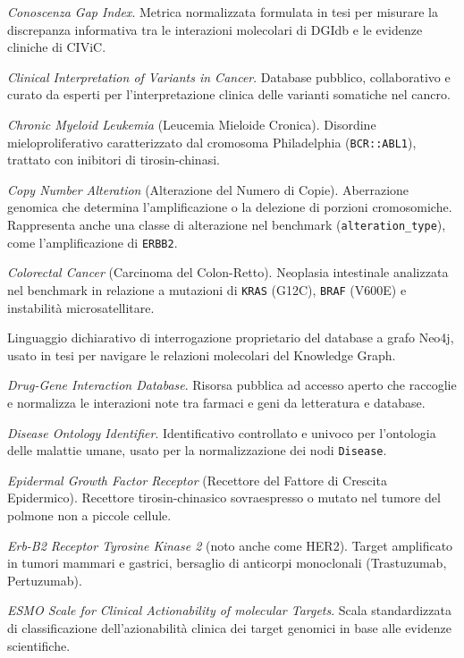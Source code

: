 \documentclass[11pt,a4paper]{article}
\newcommand{\code}[1]{\texttt{\small #1}}
\begin{document}
\begin{description}[leftmargin=1.4em,style=nextline]
\item[CGI] \emph{Conoscenza Gap Index}. Metrica normalizzata formulata in tesi per misurare la discrepanza informativa tra le interazioni molecolari di DGIdb e le evidenze cliniche di CIViC.
\item[CIViC] \emph{Clinical Interpretation of Variants in Cancer}. Database pubblico, collaborativo e curato da esperti per l'interpretazione clinica delle varianti somatiche nel cancro.
\item[CML] \emph{Chronic Myeloid Leukemia} (Leucemia Mieloide Cronica). Disordine mieloproliferativo caratterizzato dal cromosoma Philadelphia (\code{BCR::ABL1}), trattato con inibitori di tirosin-chinasi.
\item[CNA] \emph{Copy Number Alteration} (Alterazione del Numero di Copie). Aberrazione genomica che determina l'amplificazione o la delezione di porzioni cromosomiche. Rappresenta anche una classe di alterazione nel benchmark (\code{alteration\_type}), come l'amplificazione di \code{ERBB2}.
\item[CRC] \emph{Colorectal Cancer} (Carcinoma del Colon-Retto). Neoplasia intestinale analizzata nel benchmark in relazione a mutazioni di \code{KRAS} (G12C), \code{BRAF} (V600E) e instabilità microsatellitare.
\item[CYPHER] Linguaggio dichiarativo di interrogazione proprietario del database a grafo Neo4j, usato in tesi per navigare le relazioni molecolari del Knowledge Graph.
\item[DGIdb] \emph{Drug-Gene Interaction Database}. Risorsa pubblica ad accesso aperto che raccoglie e normalizza le interazioni note tra farmaci e geni da letteratura e database.
\item[DOID] \emph{Disease Ontology Identifier}. Identificativo controllato e univoco per l'ontologia delle malattie umane, usato per la normalizzazione dei nodi \code{Disease}.
\item[EGFR] \emph{Epidermal Growth Factor Receptor} (Recettore del Fattore di Crescita Epidermico). Recettore tirosin-chinasico sovraespresso o mutato nel tumore del polmone non a piccole cellule.
\item[ERBB2] \emph{Erb-B2 Receptor Tyrosine Kinase 2} (noto anche come HER2). Target amplificato in tumori mammari e gastrici, bersaglio di anticorpi monoclonali (Trastuzumab, Pertuzumab).
\item[ESCAT] \emph{ESMO Scale for Clinical Actionability of molecular Targets}. Scala standardizzata di classificazione dell'azionabilità clinica dei target genomici in base alle evidenze scientifiche.

\end{description}
\end{document}
